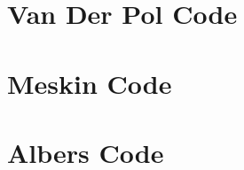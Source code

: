 \chapter{Van Der Pol Code}
\label{Van Der Pol Code}

\chapter{Meskin Code}
\label{Meskin Code}

\chapter{Albers Code}
\label{Albers Code}
